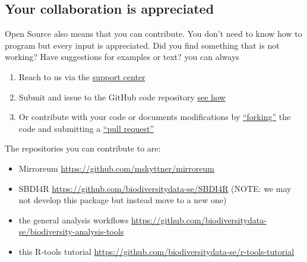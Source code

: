 \documentclass[
  10pt,
]{article}
\providecommand{\tightlist}{%
  \setlength{\itemsep}{0pt}\setlength{\parskip}{0pt}}
\begin{document}
\hypertarget{your-collaboration-is-appreciated}{%
\subsection*{Your collaboration is appreciated}\label{your-collaboration-is-appreciated}}

Open Source also means that you can contribute. You don't need to know how to program but every input is appreciated. Did you find something that is not working? Have suggestions for examples or text? you can always

\begin{enumerate}
\def\labelenumi{\arabic{enumi}.}
\tightlist
\item
  Reach to us via the \href{https://docs.biodiversitydata.se/support/}{support center}
\item
  Submit and issue to the GitHub code repository \href{https://docs.github.com/en/github/managing-your-work-on-github/managing-your-work-with-issues-and-pull-requests/creating-an-issue}{see how}
\item
  Or contribute with your code or documents modifications by \href{https://docs.github.com/en/github/getting-started-with-github/quickstart/fork-a-repo}{``forking''} the code and submitting a \href{https://docs.github.com/en/github/collaborating-with-issues-and-pull-requests/proposing-changes-to-your-work-with-pull-requests/creating-a-pull-request-from-a-fork}{``pull request''}
\end{enumerate}

The repositories you can contribute to are:

\begin{itemize}
\tightlist
\item
  Mirroreum \url{https://github.com/mskyttner/mirroreum}\\
\item
  SBDI4R \url{https://github.com/biodiversitydata-se/SBDI4R} (NOTE: we may not develop this package but instead move to a new one)\\
\item
  the general analysis workflows \url{https://github.com/biodiversitydata-se/biodiversity-analysis-tools}\\
\item
  this R-tools tutorial \url{https://github.com/biodiversitydata-se/r-tools-tutorial}
\end{itemize}
\end{document}
